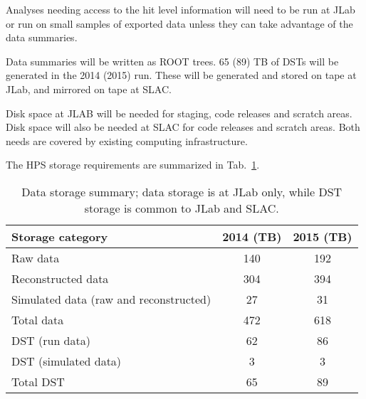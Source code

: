 Analyses needing
access to the hit level information will need to be run at JLab or run
on small samples of exported data unless they can take advantage of the
data summaries.

Data summaries will be written as ROOT trees. 65 (89) TB of DSTs will be generated 
in the 2014 (2015) run. These will be generated and stored on tape at JLab, and mirrored on tape at SLAC.

Disk space at JLAB will be 
needed for staging, code releases and scratch areas. 
Disk space will also be needed at SLAC for code releases and scratch areas. 
Both needs are covered by existing computing infrastructure.

The HPS storage requirements are summarized in Tab.~\ref{tab:datastorage}.
\begin{table}[ht]
\centering
\begin{tabular}{|l|c|c|}
\hline
Storage category & 2014 (TB) & 2015 (TB) \\
\hline
Raw data & 140 & 192 \\
Reconstructed data & 304 & 394 \\
Simulated data (raw and reconstructed) & 27 & 31 \\
\hline
Total data & 472 & 618 \\
\hline
DST (run data) & 62 & 86 \\
DST (simulated data) & 3 & 3 \\
\hline
Total DST  & 65  & 89 \\
\hline
\end{tabular}
\caption{{\small Data storage summary; data storage is at JLab only, while DST storage is common to JLab and SLAC.}}
\label{tab:datastorage}
\end{table}

